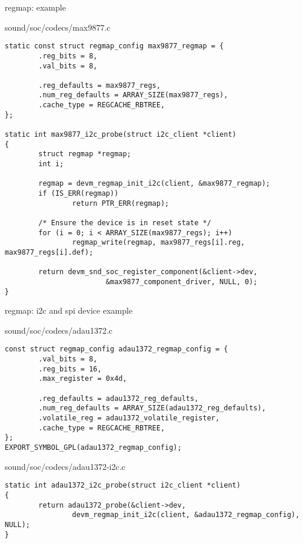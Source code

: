\begin{frame}[fragile]{regmap: example}
  \begin{block}{sound/soc/codecs/max9877.c}
  \fontsize{8}{8}\selectfont
    \begin{verbatim}
static const struct regmap_config max9877_regmap = {
        .reg_bits = 8,
        .val_bits = 8,

        .reg_defaults = max9877_regs,
        .num_reg_defaults = ARRAY_SIZE(max9877_regs),
        .cache_type = REGCACHE_RBTREE,
};

static int max9877_i2c_probe(struct i2c_client *client)
{
        struct regmap *regmap;
        int i;

        regmap = devm_regmap_init_i2c(client, &max9877_regmap);
        if (IS_ERR(regmap))
                return PTR_ERR(regmap);

        /* Ensure the device is in reset state */
        for (i = 0; i < ARRAY_SIZE(max9877_regs); i++)
                regmap_write(regmap, max9877_regs[i].reg, max9877_regs[i].def);

        return devm_snd_soc_register_component(&client->dev,
                        &max9877_component_driver, NULL, 0);
}
    \end{verbatim}
  \end{block}
\end{frame}

\begin{frame}[fragile]{regmap: i2c and spi device example}
  \begin{block}{sound/soc/codecs/adau1372.c}
  \fontsize{8}{8}\selectfont
    \begin{verbatim}
const struct regmap_config adau1372_regmap_config = {
        .val_bits = 8,
        .reg_bits = 16,
        .max_register = 0x4d,

        .reg_defaults = adau1372_reg_defaults,
        .num_reg_defaults = ARRAY_SIZE(adau1372_reg_defaults),
        .volatile_reg = adau1372_volatile_register,
        .cache_type = REGCACHE_RBTREE,
};
EXPORT_SYMBOL_GPL(adau1372_regmap_config);
    \end{verbatim}
  \end{block}
  \begin{block}{sound/soc/codecs/adau1372-i2c.c}
  \fontsize{8}{8}\selectfont
    \begin{verbatim}
static int adau1372_i2c_probe(struct i2c_client *client)
{
        return adau1372_probe(&client->dev,
                devm_regmap_init_i2c(client, &adau1372_regmap_config), NULL);
}
    \end{verbatim}
  \end{block}
\end{frame}

